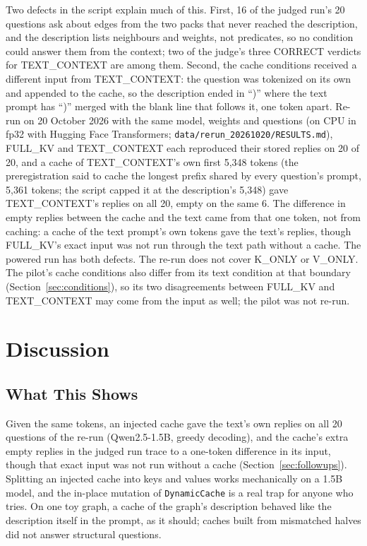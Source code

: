 \documentclass[11pt,a4paper]{article}
\begin{document}
Two defects in the script explain much of this. First, 16 of the judged run's 20 questions ask about edges from the two packs that never reached the description, and the description lists neighbours and weights, not predicates, so no condition could answer them from the context; two of the judge's three CORRECT verdicts for TEXT\_CONTEXT are among them. Second, the cache conditions received a different input from TEXT\_CONTEXT: the question was tokenized on its own and appended to the cache, so the description ended in ``)'' where the text prompt has ``)'' merged with the blank line that follows it, one token apart. Re-run on 20 October 2026 with the same model, weights and questions (on CPU in fp32 with Hugging Face Transformers; \nolinkurl{data/rerun_20261020/RESULTS.md}), FULL\_KV and TEXT\_CONTEXT each reproduced their stored replies on 20 of 20, and a cache of TEXT\_CONTEXT's own first 5,348 tokens (the preregistration said to cache the longest prefix shared by every question's prompt, 5,361 tokens; the script capped it at the description's 5,348) gave TEXT\_CONTEXT's replies on all 20, empty on the same 6. The difference in empty replies between the cache and the text came from that one token, not from caching: a cache of the text prompt's own tokens gave the text's replies, though FULL\_KV's exact input was not run through the text path without a cache. The powered run has both defects. The re-run does not cover K\_ONLY or V\_ONLY. The pilot's cache conditions also differ from its text condition at that boundary (Section~\ref{sec:conditions}), so its two disagreements between FULL\_KV and TEXT\_CONTEXT may come from the input as well; the pilot was not re-run.

\section{Discussion}

\subsection{What This Shows}

Given the same tokens, an injected cache gave the text's own replies on all 20 questions of the re-run (Qwen2.5-1.5B, greedy decoding), and the cache's extra empty replies in the judged run trace to a one-token difference in its input, though that exact input was not run without a cache (Section~\ref{sec:followups}). Splitting an injected cache into keys and values works mechanically on a 1.5B model, and the in-place mutation of \texttt{DynamicCache} is a real trap for anyone who tries. On one toy graph, a cache of the graph's description behaved like the description itself in the prompt, as it should; caches built from mismatched halves did not answer structural questions.
\end{document}
